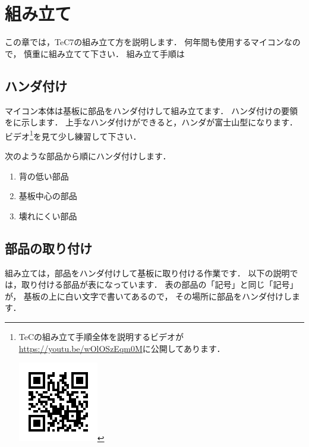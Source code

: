 \renewcommand{\myincludegraphics}[2]{\texttt{[image: chap3/\#1]}}

\chapter{組み立て\label{kumitate}}

この章では，TeC7の組み立て方を説明します．
何年間も使用するマイコンなので，
慎重に組み立てて下さい．
組み立て手順は

\section{ハンダ付け}

マイコン本体は基板に部品をハンダ付けして組み立てます．
ハンダ付けの要領をに示します．
上手なハンダ付けができると，ハンダが富士山型になります．
ビデオ\footnote{
\begin{minipage}[t]{0.9\columnwidth}
\begin{minipage}{0.75\columnwidth}
TeCの組み立て手順全体を説明するビデオが
\url{https://youtu.be/wOlOSzEqm0M}に公開してあります．
\end{minipage}\hfill
\begin{minipage}{0.2\columnwidth}
\includegraphics[scale=0.4]{chap3/QR.png}
\end{minipage}
\end{minipage}
}を見て少し練習して下さい．


次のような部品から順にハンダ付けします．

\begin{enumerate}
\item 背の低い部品
\item 基板中心の部品
\item 壊れにくい部品
\end{enumerate}

\section{部品の取り付け}
組み立ては，部品をハンダ付けして基板に取り付ける作業です．
以下の説明では，取り付ける部品が表になっています．
表の部品の「記号」と同じ「記号」が，
基板の上に白い文字で書いてあるので，
その場所に部品をハンダ付けします．

